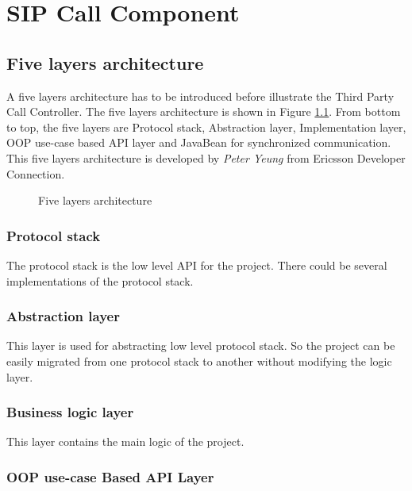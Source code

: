 
\chapter{SIP Call Component}
\label{sec:SIPCallComponent}

\section{Five layers architecture}

A five layers architecture has to be introduced before illustrate the Third Party Call Controller. The five layers architecture is shown in Figure \ref{fig:FiveLayersArchitecture}. From bottom to top, the five layers are Protocol stack, Abstraction layer, Implementation layer, OOP use-case based API layer and JavaBean for synchronized communication. This five layers architecture is developed by \textit{Peter Yeung} from Ericsson Developer Connection.

\begin{figure}[!hbtp]
\centering
{}
\caption{Five layers architecture}
\label{fig:FiveLayersArchitecture}
\end{figure}

\subsection{Protocol stack}

The protocol stack is the low level API for the project. There could be several implementations of the protocol stack. 

\subsection{Abstraction layer}

This layer is used for abstracting low level protocol stack. So the project can be easily migrated from one protocol stack to another without modifying the logic layer.

\subsection{Business logic layer}

This layer contains the main logic of the project.

\subsection{OOP use-case Based API Layer}

